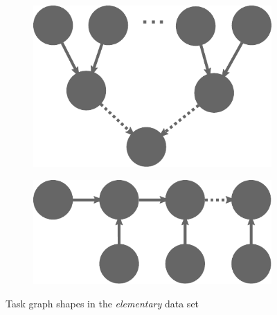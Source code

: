 \begin{figure}
\begin{subfigure}{.2\textwidth}
		\caption{}
		\label{fig:tg-splitters}
	\end{subfigure}
	\begin{subfigure}{.2\textwidth}
		\centering
		\includegraphics[width=.8\linewidth]{imgs/estee/shapes/conflux}
		\caption{}
		\label{fig:tg-conflux}
	\end{subfigure}
	\begin{subfigure}{.2\textwidth}
		\centering
		\includegraphics[width=.8\linewidth]{imgs/estee/shapes/fern}
		\caption{}
		\label{fig:tg-fern}
	\end{subfigure}

	\caption{Task graph shapes in the \emph{elementary} data set}
	\label{fig:estee-elementary-shapes}
\end{figure}

